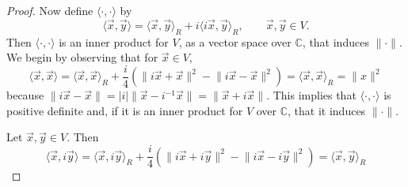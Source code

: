 \documentclass{homework}
\begin{document}
\begin{proof}
		Now define $\langle\cdot,\cdot\rangle$ by
		\begin{equation*}
			\langle\vec{x},\vec{y}\rangle = \langle\vec{x},\vec{y}\rangle_R+ i\langle i\vec{x}, \vec{y}\rangle_R, \qquad \vec{x},\vec{y}\in V.
		\end{equation*}
		Then $\langle\cdot,\cdot\rangle$ is an inner product for $V$, as a vector space over $\mathbb{C}$, that induces $\lVert\cdot\rVert$. We begin by observing that for $\vec{x} \in V$,
		\begin{equation*}
			\langle \vec{x}, \vec{x}\rangle = \langle \vec{x}, \vec{x}\rangle_R + \frac{i}{4}\left(\lVert i\vec{x} + \vec{x}\rVert^2 - \lVert i\vec{x} - \vec{x}\rVert^2\right) = \langle \vec{x},\vec{x}\rangle_R = \lVert x\rVert^2
		\end{equation*}
		because $\lVert i\vec{x} - \vec{x}\rVert = |i|\lVert\vec{x} - i^{-1}\vec{x}\rVert = \lVert \vec{x} + i\vec{x}\rVert$. This implies that $\langle \cdot,\cdot\rangle$ is positive definite and, if it is an inner product for $V$ over $\mathbb{C}$, that it induces $\lVert\cdot\rVert$.
		
		Let $\vec{x}, \vec{y} \in V$. Then
		\begin{equation*}
			\langle \vec{x}, i\vec{y}\rangle = \langle \vec{x},i\vec{y}\rangle_R + \frac{i}{4}\left(\lVert i\vec{x} + i\vec{y}\rVert^2 - \lVert i\vec{x} - i\vec{y}\rVert^2\right) = \langle\vec{x},\vec{y}\rangle_R
		\end{equation*}
	\end{proof}
	
	\question
	
	\question
\end{document}
